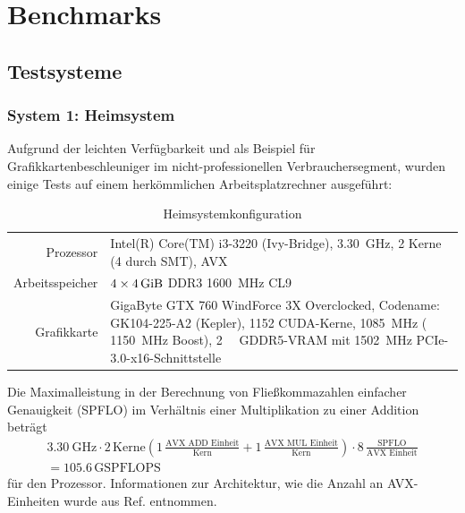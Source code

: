\chapter{Benchmarks}
\label{sct:benchmarks}

\section{Testsysteme}
\subsection{System 1: Heimsystem}
\label{sct:system1}

Aufgrund der leichten Verfügbarkeit und als Beispiel für Grafikkartenbeschleuniger im nicht-professionellen Verbrauchersegment, wurden einige Tests auf einem herkömmlichen Arbeitsplatzrechner ausgeführt:

\begin{table}[H]
	\begin{center}\begin{tabularx}{0.9\linewidth}{r|X}
	Prozessor & Intel(R) Core(TM) i3-3220 (Ivy-Bridge), \SI{3.30}{\giga\hertz}, 2 Kerne (4 durch SMT), AVX\cite{ark3220} \\
	Arbeitsspeicher & $4\times \SI{4}{\gibi\byte}$ DDR3 \SI{1600}{\mega\hertz} CL9\cite{corsair4gbddr3}\\
	\hline
	Grafikkarte & GigaByte GTX 760 WindForce 3X Overclocked, Codename: GK104-225-A2 (Kepler), 1152 CUDA-Kerne, \SI{1085}{\mega\hertz} ( \SI{1150}{\mega\hertz} Boost), \SI{2}{\gibi\byte} GDDR5-VRAM mit \SI{1502}{\mega\hertz} PCIe-3.0-x16-Schnittstelle\cite{gigabytegtx760,gtx760,nvidiakepler}
	\end{tabularx}\end{center}
	\caption{Heimsystemkonfiguration}
\end{table}

Die Maximalleistung in der Berechnung von Fließkommazahlen einfacher Genauigkeit (SPFLO) im Verhältnis einer Multiplikation zu einer Addition beträgt
\begin{align}
	\SI{3.30}{\giga\hertz} \cdot
	2\,\text{Kerne} \left(
		1\,\frac{ \text{AVX ADD Einheit} }{ \text{Kern} } +
		1\,\frac{ \text{AVX MUL Einheit} }{ \text{Kern} }
	\right) \cdot
	8\,\frac{ \text{SPFLO} }{ \text{AVX Einheit} } \\
	= 105.6\,\text{GSPFLOPS}
\end{align}
für den Prozessor. Informationen zur Architektur, wie die Anzahl an AVX-Einheiten wurde aus Ref.\cite{cesga} entnommen.

